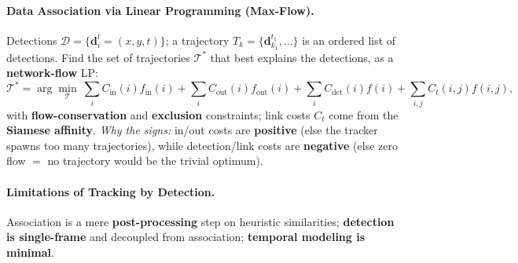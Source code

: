 \documentclass{article}
\begin{document}
\paragraph{Data Association via Linear Programming (Max-Flow).}
Detections $\mathcal D=\{\mathbf d_i^t=(x,y,t)\}$; a trajectory $T_k=\{\mathbf d_{k_1}^{t_1},\dots\}$ is an ordered list of detections. Find the set of trajectories $\mathcal T^*$ that best explains the detections, as a \textbf{network-flow} LP:
\begin{equation*}
\mathcal T^* = \arg\min_{\mathcal T}\ \sum_i C_{\text{in}}(i)f_{\text{in}}(i) + \sum_i C_{\text{out}}(i)f_{\text{out}}(i) + \sum_i C_{\text{det}}(i)f(i) + \sum_{i,j} C_t(i,j)f(i,j),
\end{equation*}
with \textbf{flow-conservation} and \textbf{exclusion} constraints; link costs $C_t$ come from the \textbf{Siamese affinity}. \textit{Why the signs:} in/out costs are \textbf{positive} (else the tracker spawns too many trajectories), while detection/link costs are \textbf{negative} (else zero flow $=$ no trajectory would be the trivial optimum).

\paragraph{Limitations of Tracking by Detection.} Association is a mere \textbf{post-processing} step on heuristic similarities; \textbf{detection is single-frame} and decoupled from association; \textbf{temporal modeling is minimal}.
\end{document}
